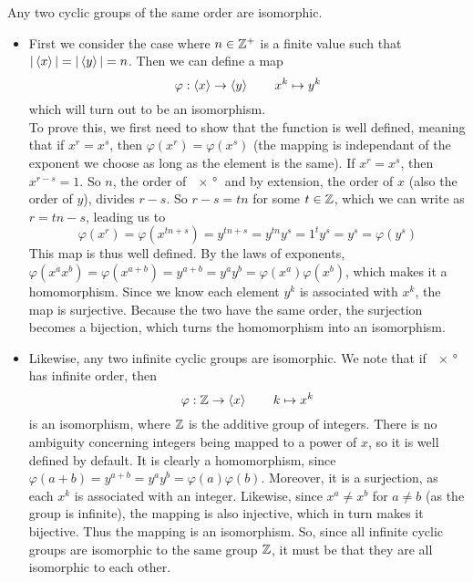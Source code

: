 \documentclass[12pt]{article}
\begin{document}
    Any two cyclic groups of the same order are isomorphic.
    \begin{itemize}[label=$\diamond$]
        \item 
            First we consider the case where
            $n \in \mathbb{Z}^+$ is a finite value
            such that $|\left\langle x \right\rangle| = |\left\langle y \right\rangle| = n$.
            Then we can define a map
            \[ \varphi: \left\langle x \right\rangle \to \left\langle y \right\rangle \qquad x^k \mapsto y^k \]
            which will turn out to be an isomorphism. \\
            To prove this,
            we first need to show that the function is well defined,
            meaning that if $x^r = x^s$,
            then $\varphi(x^r) = \varphi(x^s)$
            (the mapping is independant of the exponent we choose
            as long as the element is the same).
            If $x^r = x^s$, then $x^{r-s} = 1$.
            So $n$, the order of $\ang{x}$ and by extension,
            the order of $x$ (also the order of $y$),
            divides $r - s$.
            So $r-s = tn$ for some $t \in \mathbb{Z}$,
            which we can write as $r = tn - s$,
            leading us to
            \[
                \varphi(x^r) = \varphi(x^{tn + s})
                = y^{tn + s}
                = y^{tn}y^{s}
                = 1^ty^s
                = y^s
                = \varphi(y^s)
            \]
            This map is thus well defined.
            By the laws of exponents,
            $\varphi(x^ax^b) = \varphi(x^{a+b})
            = y^{a+b} = y^ay^b = \varphi(x^a)\varphi(x^b)$,
            which makes it a homomorphism. 
            Since we know each element $y^k$
            is associated with $x^k$,
            the map is surjective.
            Because the two have the same order,
            the surjection becomes a bijection,
            which turns the homomorphism into an isomorphism.
        \item 
            Likewise,
            any two infinite cyclic groups are isomorphic.
            We note that if $\ang{x}$ has infinite order,
            then
            \[ \varphi: \mathbb{Z} \to \left\langle x \right\rangle \qquad k \mapsto x^k \]  
            is an isomorphism,
            where $\mathbb{Z}$ is the additive group of integers.
            There is no ambiguity concerning integers being mapped
            to a power of $x$, so it is well defined by default.
            It is clearly a homomorphism,
            since $\varphi(a+b) = y^{a+b} = y^ay^b = \varphi(a)\varphi(b)$.
            Moreover, it is a surjection,
            as each $x^k$ is associated with an integer.
            Likewise,
            since $x^a \neq x^b$ for $a \neq b$
            (as the group is infinite),
            the mapping is also injective,
            which in turn makes it bijective.
            Thus the mapping is an isomorphism. 
            So, since all infinite cyclic groups are isomorphic
            to the same group $\mathbb{Z}$,
            it must be that they are all isomorphic to each other.
    \end{itemize}
\end{document}
